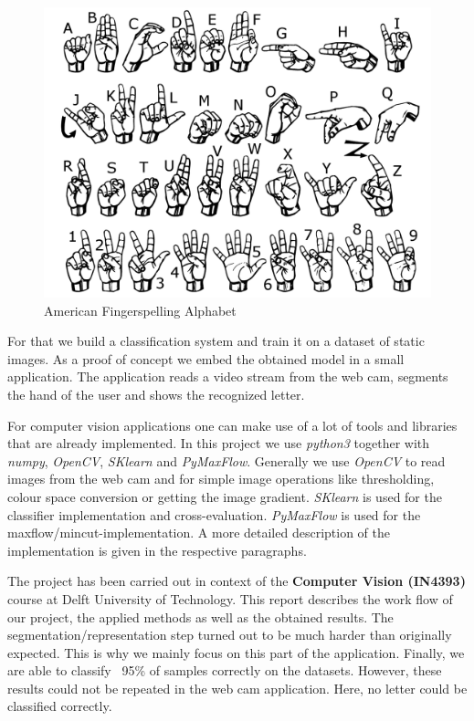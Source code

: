 \documentclass[letterpaper, 10 pt, conference]{ieeeconf}  %
\begin{document}
\begin{figure}[hb]
\centering
\includegraphics[width=0.8\linewidth]{abc.png}
\caption{American Fingerspelling Alphabet}
\label{fig:abc}
\end{figure}

For that we build a classification system and train it on a dataset of static images. As a proof of concept we embed the obtained model in a small application. The application reads a video stream from the web cam, segments the hand of the user and shows the recognized letter.

For computer vision applications one can make use of a lot of tools and libraries that are already implemented. In this project we use \textit{python3} together with \textit{numpy}, \textit{OpenCV}, \textit{SKlearn} and \textit{PyMaxFlow}. Generally we use \textit{OpenCV} to read images from the web cam and for simple image operations like thresholding, colour space conversion or getting the image gradient. \textit{SKlearn} is used for the classifier implementation and cross-evaluation. \textit{PyMaxFlow} is used for the maxflow/mincut-implementation. A more detailed description of the implementation is given in the respective paragraphs.

The project has been carried out in context of the \textbf{Computer Vision (IN4393)} course at Delft University of Technology. This report describes the work flow of our project, the applied methods as well as the obtained results. The segmentation/representation step turned out to be much harder than originally expected. This is why we mainly focus on this part of the application. Finally, we are able to classify ~95\% of samples correctly on the datasets. However, these results could not be repeated in the web cam application. Here, no letter could be classified correctly.
\end{document}
